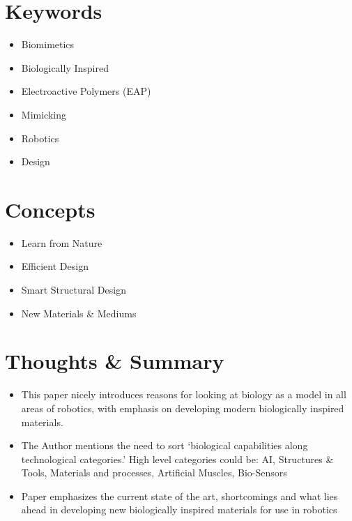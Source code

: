 \documentclass[twoside]{article}
\begin{document}
\begin{multicols}{2} %

\section{Keywords}
\begin{itemize}[noitemsep]
\item Biomimetics
\item Biologically Inspired
\item Electroactive Polymers (EAP)
\item Mimicking
\item Robotics
\item Design
\end{itemize}


\section{Concepts}
\begin{itemize}[noitemsep]
\item Learn from Nature
\item Efficient Design
\item Smart Structural Design
\item New Materials \& Mediums
\end{itemize}



\section{Thoughts \& Summary}
\begin{itemize}[noitemsep]
\item This paper nicely introduces reasons for looking at biology as a model in all areas of robotics, with emphasis on developing modern biologically inspired materials.
\item The Author mentions the need to sort `biological capabilities along technological categories.' High level categories could be: AI, Structures \& Tools, Materials and processes, Artificial Muscles, Bio-Sensors
\item Paper emphasizes the current state of the art, shortcomings and what lies ahead in developing new biologically inspired materials for use in robotics 
\end{itemize}



\end{multicols}
\end{document}
